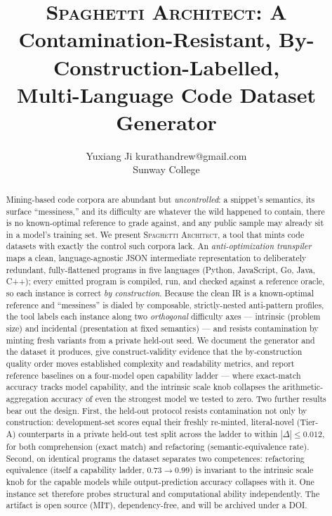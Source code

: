 \documentclass[twoside,11pt]{article}
\newcommand{\tool}{\textsc{Spaghetti Architect}}
\begin{document}
\title{\tool: A Contamination-Resistant, By-Construction-Labelled,\\
       Multi-Language Code Dataset Generator}

\author{\name Yuxiang Ji \email kurathandrew@gmail.com\\
       \addr Sunway College}

\editor{}

\maketitle

\begin{abstract}%
Mining-based code corpora are abundant but \emph{uncontrolled}: a snippet's semantics,
its surface ``messiness,'' and its difficulty are whatever the wild happened to
contain, there is no known-optimal reference to grade against, and any public sample
may already sit in a model's training set. We present \tool, a tool that mints code
datasets with exactly the control such corpora lack. An \emph{anti-optimization
transpiler} maps a clean, language-agnostic JSON intermediate representation to
deliberately redundant, fully-flattened programs in five languages
(Python, JavaScript, Go, Java, C++); every emitted program is compiled, run, and
checked against a reference oracle, so each instance is correct \emph{by construction}.
Because the clean IR is a known-optimal reference and ``messiness'' is dialed by
composable, strictly-nested anti-pattern profiles, the tool labels each instance along
two \emph{orthogonal} difficulty axes --- intrinsic (problem size) and incidental
(presentation at fixed semantics) --- and resists contamination by minting fresh
variants from a private held-out seed. We document the generator and the dataset it
produces, give construct-validity evidence that the by-construction quality order moves
established complexity and readability metrics, and report reference baselines on a
four-model open capability ladder --- where exact-match accuracy tracks model capability,
and the intrinsic scale knob collapses the arithmetic-aggregation accuracy of even the
strongest model we tested to zero. Two further results bear out the design. First, the held-out protocol
resists contamination not only by construction: development-set scores equal their
freshly re-minted, literal-novel (Tier-A) counterparts in a private held-out test split
across the ladder to within $|\Delta|\le 0.012$, for
both comprehension (exact match) and refactoring (semantic-equivalence rate). Second, on
identical programs the dataset separates two competences: refactoring
equivalence (itself a capability ladder, $0.73\!\rightarrow\!0.99$) is invariant to the
intrinsic scale knob for the capable models while output-prediction
accuracy collapses with it. One instance set therefore probes structural and computational
ability independently. The artifact is open source (MIT), dependency-free, and will be archived
under a DOI.
\end{abstract}
\end{document}
